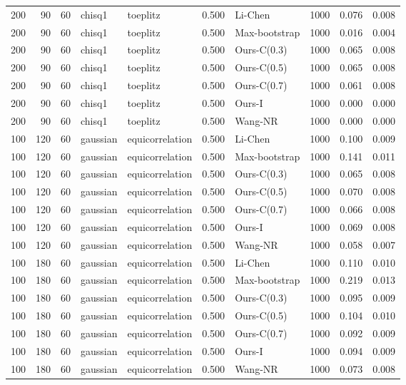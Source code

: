 \begin{tabular}{rrrllrlrrr}
200 & 90 & 60 & chisq1 & toeplitz & 0.500 & Li-Chen & 1000 & 0.076 & 0.008 \\
200 & 90 & 60 & chisq1 & toeplitz & 0.500 & Max-bootstrap & 1000 & 0.016 & 0.004 \\
200 & 90 & 60 & chisq1 & toeplitz & 0.500 & Ours-C(0.3) & 1000 & 0.065 & 0.008 \\
200 & 90 & 60 & chisq1 & toeplitz & 0.500 & Ours-C(0.5) & 1000 & 0.065 & 0.008 \\
200 & 90 & 60 & chisq1 & toeplitz & 0.500 & Ours-C(0.7) & 1000 & 0.061 & 0.008 \\
200 & 90 & 60 & chisq1 & toeplitz & 0.500 & Ours-I & 1000 & 0.000 & 0.000 \\
200 & 90 & 60 & chisq1 & toeplitz & 0.500 & Wang-NR & 1000 & 0.000 & 0.000 \\
100 & 120 & 60 & gaussian & equicorrelation & 0.500 & Li-Chen & 1000 & 0.100 & 0.009 \\
100 & 120 & 60 & gaussian & equicorrelation & 0.500 & Max-bootstrap & 1000 & 0.141 & 0.011 \\
100 & 120 & 60 & gaussian & equicorrelation & 0.500 & Ours-C(0.3) & 1000 & 0.065 & 0.008 \\
100 & 120 & 60 & gaussian & equicorrelation & 0.500 & Ours-C(0.5) & 1000 & 0.070 & 0.008 \\
100 & 120 & 60 & gaussian & equicorrelation & 0.500 & Ours-C(0.7) & 1000 & 0.066 & 0.008 \\
100 & 120 & 60 & gaussian & equicorrelation & 0.500 & Ours-I & 1000 & 0.069 & 0.008 \\
100 & 120 & 60 & gaussian & equicorrelation & 0.500 & Wang-NR & 1000 & 0.058 & 0.007 \\
100 & 180 & 60 & gaussian & equicorrelation & 0.500 & Li-Chen & 1000 & 0.110 & 0.010 \\
100 & 180 & 60 & gaussian & equicorrelation & 0.500 & Max-bootstrap & 1000 & 0.219 & 0.013 \\
100 & 180 & 60 & gaussian & equicorrelation & 0.500 & Ours-C(0.3) & 1000 & 0.095 & 0.009 \\
100 & 180 & 60 & gaussian & equicorrelation & 0.500 & Ours-C(0.5) & 1000 & 0.104 & 0.010 \\
100 & 180 & 60 & gaussian & equicorrelation & 0.500 & Ours-C(0.7) & 1000 & 0.092 & 0.009 \\
100 & 180 & 60 & gaussian & equicorrelation & 0.500 & Ours-I & 1000 & 0.094 & 0.009 \\
100 & 180 & 60 & gaussian & equicorrelation & 0.500 & Wang-NR & 1000 & 0.073 & 0.008 \\

\end{tabular}
